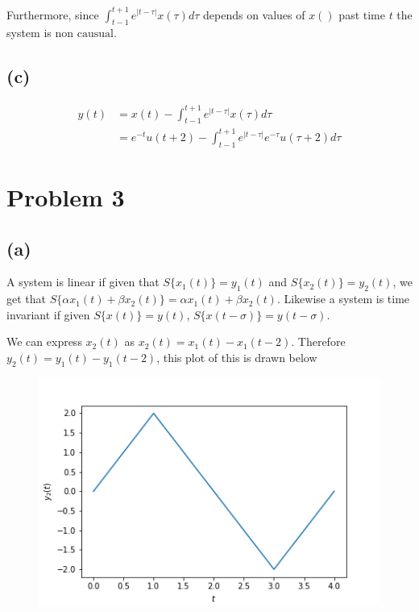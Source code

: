 \documentclass[12pt]{article}
\begin{document}
Furthermore, since $\int_{t-1}^{t+1}e^{|t-\tau|}x(\tau)d\tau$ depends on values of $x()$ past time $t$ the system is $\boxed{\text{non causual}}$.
\subsection*{(c)}
\begin{align*}
y(t)&=x(t)-\int_{t-1}^{t+1}e^{|t-\tau|}x(\tau)d\tau\\
&=\boxed{e^{-t}u(t+2)-\int_{t-1}^{t+1}e^{|t-\tau|}e^{-\tau}u(\tau+2)d\tau}
\end{align*}
\section*{Problem 3}
\subsection*{(a)}
A system is linear if given that $S\{x_1(t)\}=y_1(t)$ and $S\{x_2(t)\}=y_2(t)$, we get that $S\{\alpha x_1(t)+\beta x_2(t)\}=\alpha x_1(t) +\beta x_2(t)$. Likewise a system is time invariant if given $S\{x(t)\}=y(t)$, $S\{x(t-\sigma)\}=y(t-\sigma)$.

We can express $x_2(t)$ as $x_2(t)=x_1(t)-x_1(t-2)$. Therefore $y_2(t)=y_1(t)-y_1(t-2)$, this plot of this is drawn below
\begin{figure}[h]
\includegraphics[scale=0.3]{fig3a}
\centering
\end{figure}
\end{document}
